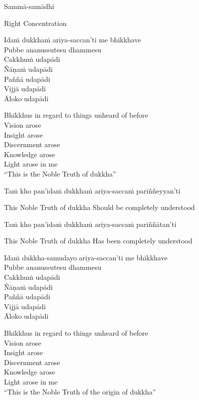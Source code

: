 Sammā-samādhi

\begin{cprenglish}
Right Concentration
\end{cprenglish}

Idaṁ dukkhaṁ ariya-saccan’ti me bhikkhave\\
Pubbe ananussutesu dhammesu\\
Cakkhuṁ udapādi\\
Ñāṇaṁ udapādi\\
Paññā udapādi\\
Vijjā udapādi\\
Āloko udapādi

\begin{cprenglish}
Bhikkhus in regard to things unheard of before\\
Vision arose\\
Insight arose\\
Discernment arose\\
Knowledge arose\\
Light arose in me\\
“This is the Noble Truth of dukkha”
\end{cprenglish}

Taṁ kho pan’idaṁ dukkhaṁ ariya-saccaṁ pariññeyyan’ti

\begin{cprenglish}
This Noble Truth of dukkha
Should be completely understood
\end{cprenglish}

Taṁ kho pan’idaṁ dukkhaṁ ariya-saccaṁ pariññātan’ti

\begin{cprenglish}
This Noble Truth of dukkha
Has been completely understood
\end{cprenglish}

Idaṁ dukkha-samudayo ariya-saccan’ti me bhikkhave\\
Pubbe ananussutesu dhammesu\\
Cakkhuṁ udapādi\\
Ñāṇaṁ udapādi\\
Paññā udapādi\\
Vijjā udapādi\\
Āloko udapādi

\begin{cprenglish}
Bhikkhus in regard to things unheard of before\\
Vision arose\\
Insight arose\\
Discernment arose\\
Knowledge arose\\
Light arose in me\\
“This is the Noble Truth of the origin of dukkha”
\end{cprenglish}


